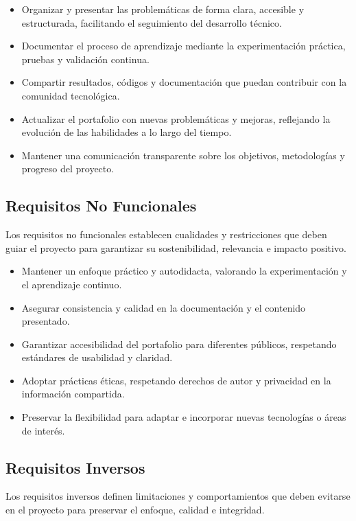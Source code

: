 \documentclass[10pt, a4paper, oneside]{article}
\begin{document}
\begin{itemize}
    \item Organizar y presentar las problemáticas de forma clara, accesible y estructurada, facilitando el seguimiento del desarrollo técnico.
    \item Documentar el proceso de aprendizaje mediante la experimentación práctica, pruebas y validación continua.
    \item Compartir resultados, códigos y documentación que puedan contribuir con la comunidad tecnológica.
    \item Actualizar el portafolio con nuevas problemáticas y mejoras, reflejando la evolución de las habilidades a lo largo del tiempo.
    \item Mantener una comunicación transparente sobre los objetivos, metodologías y progreso del proyecto.
\end{itemize}

\subsection{Requisitos No Funcionales}

Los requisitos no funcionales establecen cualidades y restricciones que deben guiar el proyecto para garantizar su sostenibilidad, relevancia e impacto positivo.

\begin{itemize}
    \item Mantener un enfoque práctico y autodidacta, valorando la experimentación y el aprendizaje continuo.
    \item Asegurar consistencia y calidad en la documentación y el contenido presentado.
    \item Garantizar accesibilidad del portafolio para diferentes públicos, respetando estándares de usabilidad y claridad.
    \item Adoptar prácticas éticas, respetando derechos de autor y privacidad en la información compartida.
    \item Preservar la flexibilidad para adaptar e incorporar nuevas tecnologías o áreas de interés.
\end{itemize}

\subsection{Requisitos Inversos}

Los requisitos inversos definen limitaciones y comportamientos que deben evitarse en el proyecto para preservar el enfoque, calidad e integridad.
\end{document}
